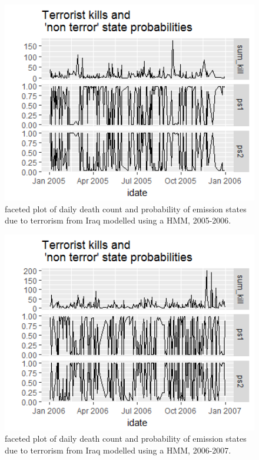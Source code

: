 \begin{figure}[t]
\includegraphics[width=15cm]{Peters_experiment_markdown_files/figure-latex/Rplot02_2005-2006_hmm.png}
\caption{faceted plot of daily death count and probability of emission states due to terrorism from Iraq modelled using a HMM, 2005-2006.}
\label{fig:Rplot02_2005_2006}
\centering
\end{figure}

\begin{figure}[t]
\includegraphics[width=15cm]{Peters_experiment_markdown_files/figure-latex/Rplot02_2006_2007.png}
\caption{faceted plot of daily death count and probability of emission states due to terrorism from Iraq modelled using a HMM, 2006-2007.}
\label{fig:Rplot02_2006_2007}
\centering
\end{figure}

